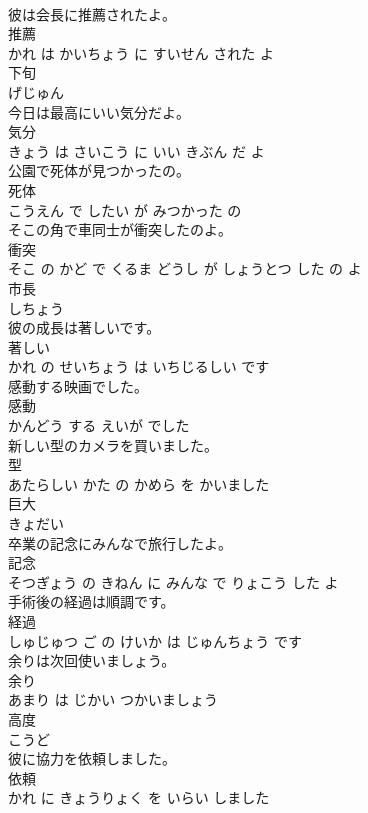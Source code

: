 \documentclass[8pt]{extreport}
\begin{document}
\begin{CJK}{UTF8}{min}
\\	彼は会長に推薦されたよ。	
\\	推薦 
\\	かれ は かいちょう に すいせん された よ		
\\	下旬	
\\	げじゅん		
\\	今日は最高にいい気分だよ。	
\\	気分 
\\	きょう は さいこう に いい きぶん だ よ		
\\	公園で死体が見つかったの。	
\\	死体 
\\	こうえん で したい が みつかった の		
\\	そこの角で車同士が衝突したのよ。	
\\	衝突 
\\	そこ の かど で くるま どうし が しょうとつ した の よ		
\\	市長	
\\	しちょう		
\\	彼の成長は著しいです。	
\\	著しい 
\\	かれ の せいちょう は いちじるしい です		
\\	感動する映画でした。	
\\	感動 
\\	かんどう する えいが でした		
\\	新しい型のカメラを買いました。	
\\	型 
\\	あたらしい かた の かめら を かいました		
\\	巨大	
\\	きょだい		
\\	卒業の記念にみんなで旅行したよ。	
\\	記念 
\\	そつぎょう の きねん に みんな で りょこう した よ		
\\	手術後の経過は順調です。	
\\	経過 
\\	しゅじゅつ ご の けいか は じゅんちょう です		
\\	余りは次回使いましょう。	
\\	余り 
\\	あまり は じかい つかいましょう		
\\	高度	
\\	こうど		
\\	彼に協力を依頼しました。	
\\	依頼 
\\	かれ に きょうりょく を いらい しました		

\end{CJK}
\end{document}
